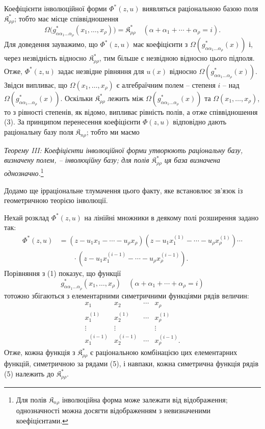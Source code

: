 \documentclass[11pt]{article}
\providecommand{\Kfield}{\mathfrak{K}}
\begin{document}
Коефіцієнти інволюційної форми $\Phi^*(z,u)$ виявляться раціональною базою поля $\Kfield^*_{\rho\rho}$; тобто має місце співвідношення
\begin{equation}
  \Omega\bigl(g^*_{\alpha\alpha_1\ldots\alpha_\rho}(x_1,
  \ldots,x_\rho)\bigr)=\Kfield^*_{\rho\rho}
  \quad(\alpha+\alpha_1+\cdots+\alpha_\rho=i).
\tag{3}
\end{equation}
Для доведення зауважимо, що $\Phi^*(z,u)$ має коефіцієнти з $\Omega(g^*_{\alpha\alpha_1\ldots\alpha_\rho}(x))$ і, через незвідність відносно $\Kfield^*_{\rho\rho}$, тим більше є незвідною відносно цього підполя. Отже, $\Phi^*(z,u)$ задає незвідне рівняння для $u(x)$ відносно $\Omega(g^*_{\alpha\alpha_1\ldots\alpha_\rho}(x))$. Звідси випливає, що $\Omega(x_1,\ldots,x_\rho)$ є алгебраїчним полем -- степеня $i$ -- над $\Omega(g^*_{\alpha\alpha_1\ldots\alpha_\rho}(x))$. Оскільки $\Kfield^*_{\rho\rho}$ лежить між $\Omega(g^*_{\alpha\alpha_1\ldots\alpha_\rho}(x))$ та $\Omega(x_1,\ldots,x_\rho)$, то з рівності степенів, як відомо, випливає рівність полів, а отже співвідношення (3). За принципом перенесення коефіцієнти $\Phi(z,u)$ відповідно дають раціональну базу поля $\Kfield_{n\rho}$; тобто ми маємо

\emph{Теорему III: Коефіцієнти інволюційної форми утворюють раціональну базу, визначену полем, -- інволюційну базу; для полів $\Kfield^*_{\rho\rho}$ ця база визначена однозначно.}\footnote{Для полів $\Kfield_{n\rho}$ інволюційна форма може залежати від відображення; однозначності можна досягти відображенням з невизначеними коефіцієнтами.}

Додамо ще ірраціональне тлумачення цього факту, яке встановлює зв'язок із геометричною теорією інволюції.

Нехай розклад $\Phi^*(z,u)$ на лінійні множники в деякому полі розширення задано так:
\begin{equation}
\begin{aligned}
 \Phi^*(z,u)&=(z-u_1x_1-\cdots-u_\rho x_\rho)
 (z-u_1x_1^{(1)}-\cdots-u_\rho x_\rho^{(1)})\cdots\\
 &\qquad\cdot
 (z-u_1x_1^{(i-1)}-\cdots-u_\rho x_\rho^{(i-1)}).
\end{aligned}
\tag{4}
\end{equation}
Порівняння з (1) показує, що функції
\[
  g^*_{\alpha\alpha_1\ldots\alpha_\rho}(x_1,
  \ldots,x_\rho)\quad(\alpha+\alpha_1+\cdots+\alpha_\rho=i)
\]
тотожно збігаються з елементарними симетричними функціями рядів величин:
\begin{equation}
\begin{array}{cccc}
  x_1 & x_2 & \cdots & x_\rho\\
  x_1^{(1)} & x_2^{(1)} & \cdots & x_\rho^{(1)}\\
  \vdots & \vdots & & \vdots\\
  x_1^{(i-1)} & x_2^{(i-1)} & \cdots & x_\rho^{(i-1)}.
\end{array}
\tag{5}
\end{equation}
Отже, кожна функція з $\Kfield^*_{\rho\rho}$ є раціональною комбінацією цих елементарних функцій, симетричною за рядами (5), і навпаки, кожна симетрична функція рядів (5) належить до $\Kfield^*_{\rho\rho}$.
\end{document}
